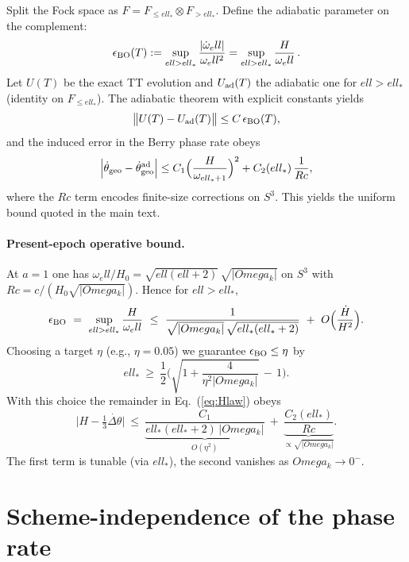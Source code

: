 \documentclass[aps,prd,twocolumn,amsmath,amssymb,nofootinbib,superscriptaddress]{revtex4-2}
\def\mathcal#1{#1}%
\def\Rc{Rc}%
\def\Omega{Omega}\def\sigma{sigma}\def\chi{chi}\def\ell{ell}%
\newcommand{\Rc}{\mathcal{R}_c}
\begin{document}
Split the Fock space as $\mathcal F=\mathcal F_{\le\ell_*}\otimes\mathcal F_{>\ell_*}$.
Define the adiabatic parameter on the complement:
\begin{equation}
\epsilon_{\rm BO}(T):=\sup_{\ell>\ell_*}\frac{|\dot{\omega}_\ell|}{\omega_\ell^2}
=\sup_{\ell>\ell_*}\frac{H}{\omega_\ell}\,.
\end{equation}
Let $U(T)$ be the exact TT evolution and $U_{\rm ad}(T)$ the adiabatic one for $\ell>\ell_*$ (identity on $\mathcal F_{\le\ell_*}$).
The adiabatic theorem with explicit constants \cite{JansenRuskaiSeiler} yields
\begin{equation}
\big\|U(T)-U_{\rm ad}(T)\big\| \le C\,\epsilon_{\rm BO}(T),
\end{equation}
and the induced error in the Berry phase rate obeys
\begin{equation}
\Big|\dot{\theta}_{\rm geo}-\dot{\theta}_{\rm geo}^{\rm ad}\Big|
\le C_1\Big(\frac{H}{\omega_{\ell_*+1}}\Big)^2 + C_2(\ell_*)\,\frac{1}{\Rc},
\end{equation}
where the $\Rc$ term encodes finite-size corrections on $S^3$. This yields the uniform bound quoted in the main text.

\paragraph*{Present-epoch operative bound.}
At $a=1$ one has $\omega_\ell/H_0=\sqrt{\ell(\ell+2)}\,\sqrt{|\Omega_k|}$ on $S^3$ with $\Rc=c/(H_0\sqrt{|\Omega_k|})$.
Hence for $\ell>\ell_*$,
\[
\epsilon_{\rm BO}\ =\ \sup_{\ell>\ell_*}\frac{H}{\omega_\ell}
\ \le\ \frac{1}{\sqrt{|\Omega_k|}\,\sqrt{\ell_*(\ell_*+2)}}
\ +\ \mathcal O\Big(\frac{\dot H}{H^2}\Big).
\]
Choosing a target $\eta$ (e.g., $\eta=0.05$) we guarantee $\epsilon_{\rm BO}\le\eta$ by
\begin{equation}
\ell_* \ \ge\ \frac{1}{2}\Bigg(\sqrt{1+\frac{4}{\eta^2|\Omega_k|}}\,-\,1\Bigg).
\label{eq:lstar_rule}
\end{equation}
With this choice the remainder in Eq.~(\ref{eq:Hlaw}) obeys
\[
\Big|H-\tfrac{1}{3}\dot{\Delta\theta}\Big|
\ \le\ \underbrace{\frac{C_1}{\ell_*(\ell_*\!+\!2)\,|\Omega_k|}}_{\mathcal O(\eta^2)}
\ +\ \underbrace{\frac{C_2(\ell_*)}{\Rc}}_{\propto\sqrt{|\Omega_k|}}.
\]
The first term is tunable (via $\ell_*$), the second vanishes as $\Omega_k\to 0^{-}$.

\section{Scheme-independence of the phase rate}
\label{app:scheme}
\end{document}
